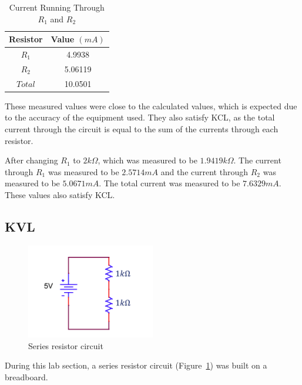 \documentclass{article}
\begin{document}
\begin{table}[H]
    \centering
    \begin{tabular}{|c|c|}
        \hline
        Resistor & Value $(mA)$ \\
        \hline
        $R_1$ & 4.9938 \\
        \hline
        $R_2$ & 5.06119 \\
        \hline
        $Total$ & 10.0501 \\
        \hline
    \end{tabular}
    \caption{Current Running Through $R_1$ and $R_2$}
    \label{tab:2.3resistor_currents}
\end{table}

These measured values were close to the calculated values, which is expected 
due to the accuracy of the equipment used. They also satisfy KCL, as the total
current through the circuit is equal to the sum of the currents through each resistor.
\newline

After changing $R_1$ to $2k\Omega$, which was measured to be $1.9419k\Omega$. The current through 
$R_1$ was measured to be $2.5714mA$ and the current through $R_2$ was measured to be $5.0671mA$. 
The total current was measured to be $7.6329mA$. These values also satisfy KCL.

\subsection{KVL}
\begin{figure}[H]
	\centering
	\includegraphics[width=0.5\textwidth]{series_resistor_circuit_for_part3.png}
	\caption{Series resistor circuit}
	\label{fig:fig5}
\end{figure}

During this lab section, a series resistor circuit (Figure~\ref{fig:fig5}) was built
on a breadboard.
\end{document}
